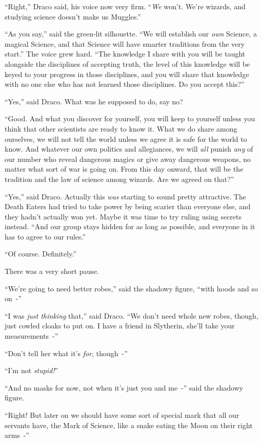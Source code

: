 ``Right,'' Draco said, his voice now very firm. ``\emph{We} won't. We're wizards, and studying science doesn't make us Muggles.''

``As you say,'' said the green-lit silhouette. ``We will establish our \emph{own} Science, a magical Science, and that Science will have smarter traditions from the very start.'' The voice grew hard. ``The knowledge I share with you will be taught alongside the disciplines of accepting truth, the level of this knowledge will be keyed to your progress in those disciplines, and you will share that knowledge with no one else who has not learned those disciplines. Do you accept this?''

``Yes,'' said Draco. What was he supposed to do, say no?

``Good. And what you discover for yourself, you will keep to yourself unless you think that other scientists are ready to know it. What we do share among ourselves, we will not tell the world unless we agree it is safe for the world to know. And whatever our own politics and allegiances, we will \emph{all} punish \emph{any} of our number who reveal dangerous magics or give away dangerous weapons, no matter what sort of war is going on. From this day onward, that will be the tradition and the law of science among wizards. Are we agreed on that?''

``Yes,'' said Draco. Actually this \emph{was} starting to sound pretty attractive. The Death Eaters had tried to take power by being scarier than everyone else, and they hadn't actually won yet. Maybe it was time to try ruling using secrets instead. ``And our group stays hidden for as long as possible, and everyone in it has to agree to our rules.''

``Of course. Definitely.''

There was a very short pause.

``We're going to need better robes,'' said the shadowy figure, ``with hoods and so on~-''

``I was \emph{just thinking} that,'' said Draco. ``We don't need whole new robes, though, just cowled cloaks to put on. I have a friend in Slytherin, she'll take your measurements~-''

``Don't tell her what it's \emph{for}, though~-''

``I'm not \emph{stupid!}''

``And no masks for now, not when it's just you and me~-'' said the shadowy figure.

``Right! But later on we should have some sort of special mark that all our servants have, the Mark of Science, like a snake eating the Moon on their right arms~-''

